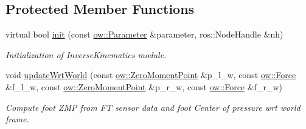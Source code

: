\subsection*{Protected Member Functions}
\begin{DoxyCompactItemize}
\item 
virtual bool \hyperlink{classow__zmp_1_1ZmpEstimator_a9e643e1ae0e0fedabbf753e42c0fd59b}{init} (const \hyperlink{classow_1_1Parameter}{ow\+::\+Parameter} \&parameter, ros\+::\+Node\+Handle \&nh)\hypertarget{classow__zmp_1_1ZmpEstimator_a9e643e1ae0e0fedabbf753e42c0fd59b}{}\label{classow__zmp_1_1ZmpEstimator_a9e643e1ae0e0fedabbf753e42c0fd59b}

\begin{DoxyCompactList}\small\item\em Initialization of Inverse\+Kinematics module. \end{DoxyCompactList}\item 
void \hyperlink{classow__zmp_1_1ZmpEstimator_af892501b096465ad6f1c32a69730c0e6}{update\+Wrt\+World} (const \hyperlink{classow__core_1_1ZeroMomentPoint}{ow\+::\+Zero\+Moment\+Point} \&p\+\_\+l\+\_\+w, const \hyperlink{classow__core_1_1Force}{ow\+::\+Force} \&f\+\_\+l\+\_\+w, const \hyperlink{classow__core_1_1ZeroMomentPoint}{ow\+::\+Zero\+Moment\+Point} \&p\+\_\+r\+\_\+w, const \hyperlink{classow__core_1_1Force}{ow\+::\+Force} \&f\+\_\+r\+\_\+w)
\begin{DoxyCompactList}\small\item\em Compute foot Z\+MP from FT sensor data and foot Center of pressure wrt world frame. \end{DoxyCompactList}\end{DoxyCompactItemize}
